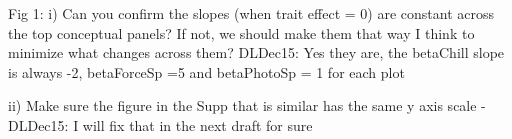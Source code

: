 \documentclass{article}
\begin{document}
Fig 1:
i) Can you confirm the slopes (when trait effect = 0) are constant across the top conceptual panels? If not, we should make them that way I think to minimize what changes across them?
DLDec15: Yes they are, the betaChill slope is always -2, betaForceSp =5 and betaPhotoSp = 1 for each plot

ii) Make sure the figure in the Supp that is similar has the same y axis scale -
DLDec15: I will fix that in the next draft for sure
\end{document}
